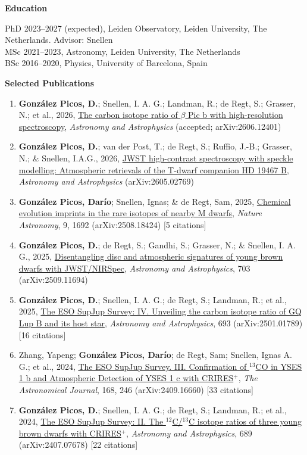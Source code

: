 \documentclass[10pt,letterpaper]{article}
\newcommand{\sectionheader}[1]{\vspace{0.55em}\noindent\textbf{#1}\vspace{0.15em}\par}
\newcommand{\pubitem}[2]{\item[#1] #2}
\begin{document}
\sectionheader{Education}
\noindent PhD 2023--2027 (expected), Leiden Observatory, Leiden University, The Netherlands. Advisor: Snellen\\
MSc 2021--2023, Astronomy, Leiden University, The Netherlands\\
BSc 2016--2020, Physics, University of Barcelona, Spain

\sectionheader{Selected Publications}
\begin{enumerate}[label=\arabic*., leftmargin=2.2em, itemsep=0.25em, topsep=0.15em, parsep=0pt]
\pubitem{7}{\textbf{Gonz\'alez Picos, D.}; Snellen, I. A. G.; Landman, R.; de Regt, S.; Grasser, N.; et al., 2026, \href{https://arxiv.org/abs/2606.12401}{The carbon isotope ratio of $\beta$ Pic b with high-resolution spectroscopy}, \emph{Astronomy and Astrophysics} (accepted; arXiv:2606.12401)}
\pubitem{6}{\textbf{Gonz\'alez Picos, D.}; van der Post, T.; de Regt, S.; Ruffio, J.-B.; Grasser, N.; \& Snellen, I.A.G., 2026, \href{https://doi.org/10.1051/0004-6361/202659296}{JWST high-contrast spectroscopy with speckle modelling: Atmospheric retrievals of the T-dwarf companion HD 19467 B}, \emph{Astronomy and Astrophysics} (arXiv:2605.02769)}
\pubitem{5}{\textbf{Gonz\'alez Picos, Dar\'io}; Snellen, Ignas; \& de Regt, Sam, 2025, \href{https://doi.org/10.1038/s41550-025-02641-4}{Chemical evolution imprints in the rare isotopes of nearby M dwarfs}, \emph{Nature Astronomy}, 9, 1692 (arXiv:2508.18424) [5 citations]}
\pubitem{4}{\textbf{Gonz\'alez Picos, D.}; de Regt, S.; Gandhi, S.; Grasser, N.; \& Snellen, I. A. G., 2025, \href{https://doi.org/10.1051/0004-6361/202555669}{Disentangling disc and atmospheric signatures of young brown dwarfs with JWST/NIRSpec}, \emph{Astronomy and Astrophysics}, 703 (arXiv:2509.11694)}
\pubitem{3}{\textbf{Gonz\'alez Picos, D.}; Snellen, I. A. G.; de Regt, S.; Landman, R.; et al., 2025, \href{https://doi.org/10.1051/0004-6361/202451936}{The ESO SupJup Survey: IV. Unveiling the carbon isotope ratio of GQ Lup B and its host star}, \emph{Astronomy and Astrophysics}, 693 (arXiv:2501.01789) [16 citations]}
\pubitem{2}{Zhang, Yapeng; \textbf{Gonz\'alez Picos, Dar\'io}; de Regt, Sam; Snellen, Ignas A. G.; et al., 2024, \href{https://doi.org/10.3847/1538-3881/ad7ea9}{The ESO SupJup Survey. III. Confirmation of $^{13}$CO in YSES 1 b and Atmospheric Detection of YSES 1 c with CRIRES$^{+}$}, \emph{The Astronomical Journal}, 168, 246 (arXiv:2409.16660) [33 citations]}
\pubitem{1}{\textbf{Gonz\'alez Picos, D.}; Snellen, I. A. G.; de Regt, S.; Landman, R.; et al., 2024, \href{https://doi.org/10.1051/0004-6361/202450028}{The ESO SupJup Survey: II. The $^{12}$C/$^{13}$C isotope ratios of three young brown dwarfs with CRIRES$^{+}$}, \emph{Astronomy and Astrophysics}, 689 (arXiv:2407.07678) [22 citations]}
\end{enumerate}
\end{document}
